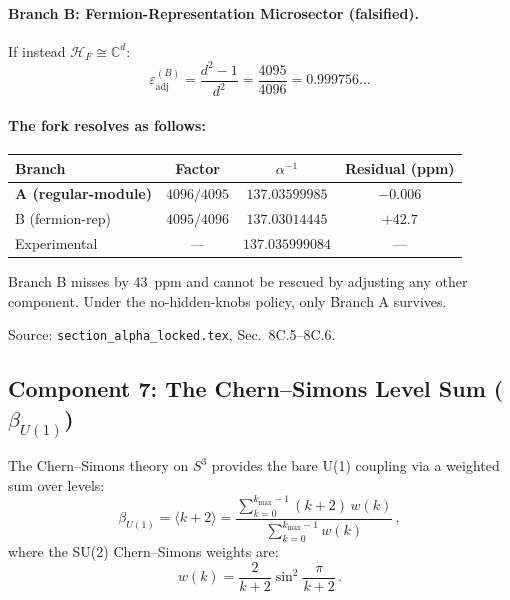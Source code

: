 \documentclass[12pt,a4paper]{article}
\begin{document}
\paragraph{Branch B: Fermion-Representation Microsector (falsified).}
If instead $\mathcal{H}_F \cong \mathbb{C}^d$:
\begin{equation}
\varepsilon_{\mathrm{adj}}^{(B)} = \frac{d^2 - 1}{d^2}
= \frac{4095}{4096} = 0.999756\ldots
\end{equation}

\paragraph{The fork resolves as follows:}
\begin{center}
\renewcommand{\arraystretch}{1.3}
\begin{tabular}{lccc}
\toprule
Branch & Factor & $\alpha^{-1}$ & Residual (ppm) \\
\midrule
\textbf{A (regular-module)} & $4096/4095$ & $137.03599985$ & $-0.006$ \\
B (fermion-rep) & $4095/4096$ & $137.03014445$ & $+42.7$ \\
\midrule
Experimental & --- & $137.035999084$ & --- \\
\bottomrule
\end{tabular}
\end{center}

Branch B misses by 43~ppm and cannot be rescued by adjusting any other
component. Under the no-hidden-knobs policy, only Branch A survives.

Source: \texttt{section\_alpha\_locked.tex}, Sec.~8C.5--8C.6.

\subsection{Component 7: The Chern--Simons Level Sum ($\beta_{U(1)}$)}

The Chern--Simons theory on $S^3$ provides the bare U(1) coupling via
a weighted sum over levels:
\begin{equation}
\beta_{U(1)} = \langle k + 2 \rangle
= \frac{\sum_{k=0}^{k_{\max}-1}(k+2)\,w(k)}
       {\sum_{k=0}^{k_{\max}-1} w(k)}\,,
\end{equation}
where the SU(2) Chern--Simons weights are:
\begin{equation}
w(k) = \frac{2}{k+2}\sin^2\frac{\pi}{k+2}\,.
\end{equation}
\end{document}
